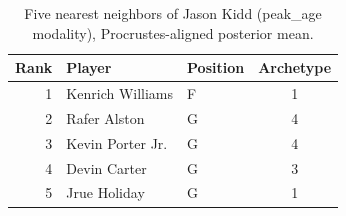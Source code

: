 \begin{table}[htbp]
  \centering\small
  \begin{tabular}{rllc}
    \toprule
    Rank & Player & Position & Archetype \\
    \midrule
    1 & Kenrich Williams & F & 1 \\
    2 & Rafer Alston & G & 4 \\
    3 & Kevin Porter Jr. & G & 4 \\
    4 & Devin Carter & G & 3 \\
    5 & Jrue Holiday & G & 1 \\
    \bottomrule
  \end{tabular}
  \caption{Five nearest neighbors of Jason Kidd (peak_age modality), Procrustes-aligned posterior mean.}
  \label{tab:Jason_Kidd_neighbors_peak_age}
\end{table}

